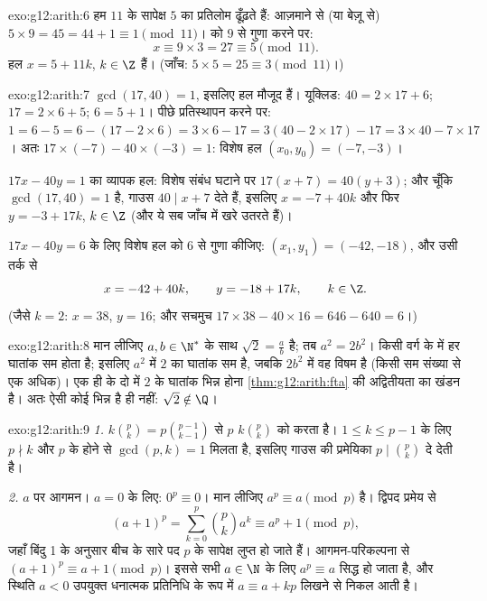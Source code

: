 \begin{solution}{exo:g12:arith:6}
हम $11$ के सापेक्ष $5$ का प्रतिलोम ढूँढ़ते हैं: आज़माने से (या बेज़ू से)
$5 \times 9 = 45 = 44 + 1 \equiv 1 \pmod{11}$।  को $9$ से गुणा करने पर:
\[
x \equiv 9 \times 3 = 27 \equiv 5 \pmod{11}.
\]
हल  $x = 5 + 11k$, $k \in \Z$ हैं। (जाँच: $5\times5 = 25 \equiv 3 \pmod{11}$।)
\end{solution}

\begin{solution}{exo:g12:arith:7}
$\gcd(17, 40) = 1$, इसलिए हल मौजूद हैं। यूक्लिड: $40 = 2\times17 + 6$; $17 = 2\times6 + 5$; $6 = 5 + 1$। पीछे प्रतिस्थापन करने
पर: $1 = 6 - 5 = 6 - (17 - 2\times6) = 3\times6 - 17
= 3(40 - 2\times17) - 17 = 3\times40 - 7\times17$। अतः $17\times(-7) - 40\times(-3) = 1$: विशेष हल $(x_0, y_0) = (-7, -3)$।

$17x - 40y = 1$ का व्यापक हल: विशेष संबंध घटाने पर $17(x + 7) = 40(y + 3)$; और चूँकि $\gcd(17, 40) = 1$ है, गाउस $40 \mid x + 7$
देते हैं, इसलिए $x = -7 + 40k$ और फिर $y = -3 + 17k$, $k \in \Z$ (और ये सब जाँच में खरे उतरते हैं)।

$17x - 40y = 6$ के लिए विशेष हल को $6$ से गुणा कीजिए: $(x_1, y_1) = (-42, -18)$, और उसी तर्क से
\[
x = -42 + 40k, \qquad y = -18 + 17k, \qquad k \in \Z .
\]
(जैसे $k = 2$: $x = 38$, $y = 16$; और सचमुच $17\times38 - 40\times16
= 646 - 640 = 6$।)
\end{solution}

\begin{solution}{exo:g12:arith:8}
मान लीजिए $a, b \in \N^*$ के साथ $\sqrt2 = \frac ab$ है; तब $a^2 = 2b^2$। किसी वर्ग के   में हर
घातांक सम होता है; इसलिए $a^2$ में $2$ का घातांक सम है, जबकि $2b^2$ में वह
विषम है (किसी सम संख्या से एक अधिक)। एक ही  के दो  में $2$
के घातांक भिन्न होना \cref{thm:g12:arith:fta} की अद्वितीयता का खंडन है। अतः ऐसी कोई भिन्न है ही
नहीं: $\sqrt2 \notin \Q$।
\end{solution}

\begin{solution}{exo:g12:arith:9}
\emph{1.} $k\binom pk = p \binom{p-1}{k-1}$ से $p$ $k\binom pk$ को  करता है। $1 \leq k \leq p-1$ के लिए $p \nmid k$ और $p$
के  होने से $\gcd(p, k) = 1$ मिलता है, इसलिए गाउस की प्रमेयिका $p \mid \binom pk$ दे देती है।

\emph{2.} $a$ पर आगमन। $a = 0$ के लिए: $0^p \equiv 0$। मान लीजिए $a^p \equiv a \pmod p$ है। द्विपद
प्रमेय से
\[
(a+1)^p = \sum_{k=0}^{p} \binom pk a^k
\equiv a^p + 1 \pmod p,
\]
जहाँ बिंदु 1 के अनुसार बीच के सारे पद $p$ के सापेक्ष लुप्त हो जाते हैं।
आगमन-परिकल्पना से $(a+1)^p \equiv a + 1 \pmod p$। इससे सभी $a \in \N$ के लिए $a^p \equiv a$ सिद्ध हो जाता है, और
स्थिति $a < 0$ उपयुक्त धनात्मक प्रतिनिधि के रूप में $a \equiv a + kp$ लिखने से निकल आती है।
\end{solution}

